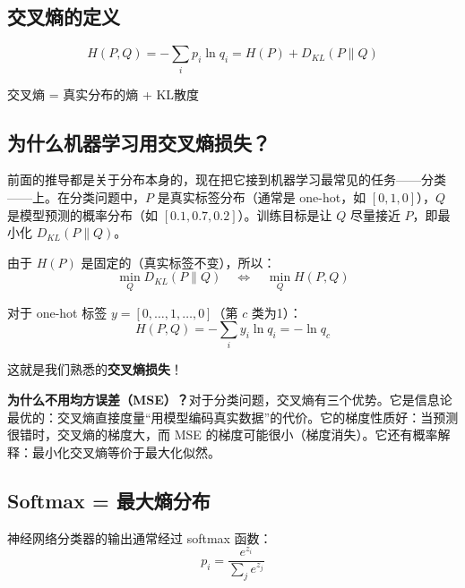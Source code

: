 \subsection{交叉熵的定义}

\begin{keyformula}[title=交叉熵]
\begin{equation}
H(P, Q) = -\sum_i p_i \ln q_i = H(P) + D_{KL}(P \| Q)
\end{equation}

交叉熵 = 真实分布的熵 + KL散度
\end{keyformula}

\subsection{为什么机器学习用交叉熵损失？}

前面的推导都是关于分布本身的，现在把它接到机器学习最常见的任务——分类——上。在分类问题中，$P$ 是真实标签分布（通常是 one-hot，如 $[0, 1, 0]$），$Q$ 是模型预测的概率分布（如 $[0.1, 0.7, 0.2]$）。训练目标是让 $Q$ 尽量接近 $P$，即最小化 $D_{KL}(P \| Q)$。

由于 $H(P)$ 是固定的（真实标签不变），所以：
\begin{equation}
\min_Q D_{KL}(P \| Q) \quad \Longleftrightarrow \quad \min_Q H(P, Q)
\end{equation}

对于 one-hot 标签 $y = [0, \ldots, 1, \ldots, 0]$（第 $c$ 类为1）：
\begin{equation}
H(P, Q) = -\sum_i y_i \ln q_i = -\ln q_c
\end{equation}

这就是我们熟悉的\textbf{交叉熵损失}！

\begin{insightbox}
\textbf{为什么不用均方误差（MSE）？}对于分类问题，交叉熵有三个优势。它是信息论最优的：交叉熵直接度量“用模型编码真实数据”的代价。它的梯度性质好：当预测很错时，交叉熵的梯度大，而 MSE 的梯度可能很小（梯度消失）。它还有概率解释：最小化交叉熵等价于最大化似然。
\end{insightbox}

\subsection{Softmax = 最大熵分布}

神经网络分类器的输出通常经过 softmax 函数：
\begin{equation}
p_i = \frac{e^{z_i}}{\sum_j e^{z_j}}
\end{equation}

